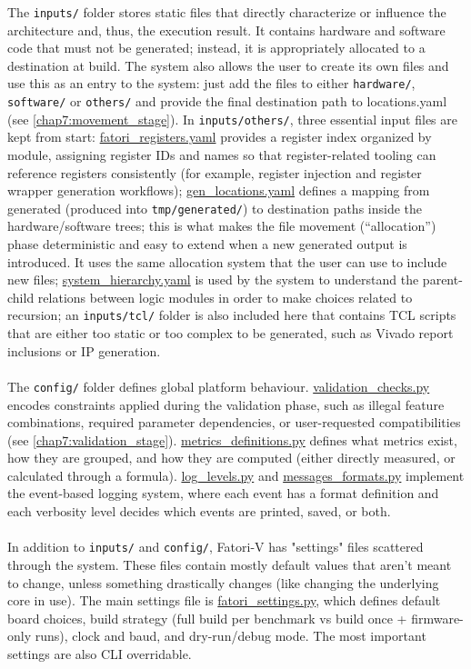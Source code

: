  The \texttt{inputs/} folder stores static files that directly characterize or influence the architecture and, thus, the execution result. It contains hardware and software code that must not be generated; instead, it is appropriately allocated to a destination at build. The system also allows the user to create its own files and use this as an entry to the system: just add the files to either \texttt{hardware/}, \texttt{software/} or \texttt{others/} and provide the final destination path to locations.yaml (see \cref{chap7:movement_stage}). In \texttt{inputs/others/}, three essential input files are kept from start: \underline{fatori\_registers.yaml} provides a register index organized by module, assigning register IDs and names so that register-related tooling can reference registers consistently (for example, register injection and register wrapper generation workflows); \underline{gen\_locations.yaml} defines a mapping from generated (produced into \texttt{tmp/generated/}) to destination paths inside the hardware/software trees; this is what makes the file movement (“allocation”) phase deterministic and easy to extend when a new generated output is introduced. It uses the same allocation system that the user can use to include new files; \underline{system\_hierarchy.yaml} is used by the system to understand the parent-child relations between logic modules in order to make choices related to recursion; an \texttt{inputs/tcl/} folder is also included here that contains TCL scripts that are either too static or too complex to be generated, such as Vivado report inclusions or IP generation.\\\\
The \texttt{config/} folder defines global platform behaviour. \underline{validation\_checks.py} encodes constraints applied during the validation phase, such as illegal feature combinations, required parameter dependencies, or user-requested compatibilities (see \cref{chap7:validation_stage}). \underline{metrics\_definitions.py} defines what metrics exist, how they are grouped, and how they are computed (either directly measured, or calculated through a formula). \underline{log\_levels.py} and \underline{messages\_formats.py} implement the event-based logging system, where each event has a format definition and each verbosity level decides which events are printed, saved, or both.\\\\
In addition to \texttt{inputs/} and \texttt{config/}, \ac{Fatori-V} has "settings" files scattered through the system. These files contain mostly default values that aren't meant to change, unless something drastically changes (like changing the underlying core in use). The main settings file is \underline{fatori\_settings.py}, which defines default board choices, build strategy (full build per benchmark vs build once + firmware-only runs), clock and baud, and dry-run/debug mode. The most important settings are also \ac{CLI} overridable.

